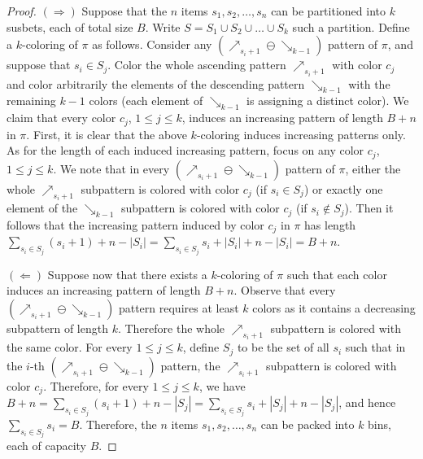 \begin{proof}
  $(\Rightarrow)$
  Suppose that the $n$ items $s_1, s_2, \dots, s_n$
  can be partitioned into $k$ susbets, each of total size $B$.
  Write $S = S_1 \cup S_2 \cup \dots \cup S_k$ such a partition.
  Define a $k$-coloring of $\pi$ as follows.
  Consider any
  $\left(\mathbf{\nearrow}_{s_i+1} \ominus \mathbf{\searrow}_{k-1}\right)$
  pattern of $\pi$,
  and suppose that $s_i \in S_j$.
  Color the whole ascending pattern $\mathbf{\nearrow}_{s_i+1}$ with color $c_j$
  and color arbitrarily the elements of the descending pattern
  $\mathbf{\searrow}_{k-1}$ with the remaining $k-1$ colors
  (each element of $\mathbf{\searrow}_{k-1}$ is assigning a distinct color).
  We claim that every color $c_j$, $1 \leq j \leq k$, induces an increasing pattern
  of length $B+n$ in $\pi$.
  First, it is clear that the above $k$-coloring induces increasing patterns only.
  As for the length of each induced increasing pattern, focus on any color
  $c_j$, $1 \leq j \leq k$.
  We note that in every
  $\left(\mathbf{\nearrow}_{s_i+1} \ominus \mathbf{\searrow}_{k-1}\right)$
  pattern of $\pi$, either the whole $\mathbf{\nearrow}_{s_i+1}$ subpattern is
  colored with color $c_j$ (if $s_i \in S_j$) or exactly one element of the
  $\mathbf{\searrow}_{k-1}$ subpattern is colored with color $c_j$
  (if $s_i \notin S_j$).
  Then it follows that the increasing pattern induced by color $c_j$ in $\pi$ has
  length
  $\sum_{s_i \in S_j} \left(s_i + 1\right) + n - |S_i|
  =
  \sum_{s_i \in S_j} s_i + |S_i| + n - |S_i|
  = B + n$.

  $(\Leftarrow)$
  Suppose now that there exists a $k$-coloring of $\pi$ such that each color
  induces
  an increasing pattern of length $B+n$.
  Observe that every
  $\left(\mathbf{\nearrow}_{s_i+1} \ominus \mathbf{\searrow}_{k-1}\right)$
  pattern requires at least $k$ colors as it contains a decreasing subpattern of
  length $k$.
  Therefore the whole $\mathbf{\nearrow}_{s_i+1}$ subpattern is colored with the
  same color.
  For every $1 \leq j \leq k$, define $S_j$ to be the set of all $s_i$ such that
  in the $i$-th
  $\left(\mathbf{\nearrow}_{s_i+1} \ominus \mathbf{\searrow}_{k-1}\right)$
  pattern, the $\mathbf{\nearrow}_{s_i+1}$ subpattern is colored with color $c_j$.
  Therefore, for every $1 \leq j \leq k$, we have
  $B + n = \sum_{s_i \in S_j} \left(s_i+1\right) + n - |S_j|
  = \sum_{s_i \in S_j} s_i + |S_j| + n - |S_j|$,
  and hence
  $\sum_{s_i \in S_j} s_i = B$.
  Therefore, the $n$ items $s_1, s_2, \dots, s_n$
  can be packed into $k$ bins, each of capacity $B$.
\end{proof}
